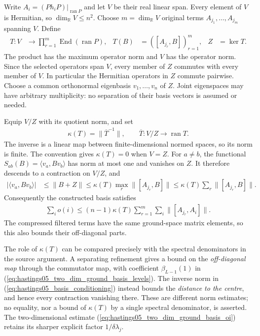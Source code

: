 \documentclass{article}
\begin{document}
Write $A_i=(Ph_iP)|_{\operatorname{ran}P}$ and let $V$ be their real linear
span. Every element of $V$ is Hermitian, so $\dim_{\mathbb R}V\le n^2$.
Choose $m=\dim_{\mathbb R}V$ original terms $A_{j_1},\dots,A_{j_m}$ spanning
$V$. Define
\begin{align}
 T:V&\longrightarrow\prod_{r=1}^m\operatorname{End}(\operatorname{ran}P),
 &T(B)&=([A_{j_r},B])_{r=1}^m,
 &Z&=\ker T.
 \label{eq:hastings05_basis_commutator_map}
\end{align}
The product has the maximum operator norm and $V$ has the operator norm.
Since the selected operators span $V$, every member of $Z$ commutes with every
member of $V$. In particular the Hermitian operators in $Z$ commute pairwise.
Choose a common orthonormal eigenbasis $v_1,\dots,v_n$ of $Z$. Joint
eigenspaces may have arbitrary multiplicity: no separation of their basis
vectors is assumed or needed.

Equip $V/Z$ with its quotient norm, and set
\begin{align}
 \kappa(T)=\|\overline T^{-1}\|,
 \qquad \overline T:V/Z\longrightarrow\operatorname{ran}T.
 \label{eq:hastings05_basis_conditioning}
\end{align}
The inverse is a linear map between finite-dimensional normed spaces, so its
norm is finite. The convention gives $\kappa(T)=0$ when $V=Z$.
For $a\ne b$, the functional $S_{ab}(B)=\langle v_a,Bv_b\rangle$ has norm at
most one and vanishes on $Z$. It therefore descends to a contraction on $V/Z$,
and
\begin{align}
 |\langle v_a,Bv_b\rangle|
 &\le \|B+Z\|\le\kappa(T)\max_r\|[A_{j_r},B]\|
 \le\kappa(T)\sum_r\|[A_{j_r},B]\|.
 \label{eq:hastings05_basis_constructed_entries}
\end{align}
Consequently the constructed basis satisfies
\begin{align}
 \sum_i o(i)\le(n-1)\kappa(T)\sum_{r=1}^m\sum_i\|[A_{j_r},A_i]\|.
 \label{eq:hastings05_basis_constructed_sum}
\end{align}
The compressed filtered terms have the same ground-space matrix elements, so
this also bounds their off-diagonal parts.

The role of $\kappa(T)$ can be compared precisely with the spectral denominators
in the source argument. A separating refinement gives a bound on the
\emph{off-diagonal map} through the commutator map, with coefficient
$\beta_{L-1}(1)$ in (\ref{eq:hastings05_two_dim_ground_basis_levels}).
The inverse norm in (\ref{eq:hastings05_basis_conditioning}) instead bounds the
\emph{distance to the centre}, and hence every contraction vanishing there.
These are different norm estimates; no equality, nor a bound of $\kappa(T)$ by a
single spectral denominator, is asserted. The two-dimensional estimate
(\ref{eq:hastings05_two_dim_ground_basis_oi}) retains its sharper explicit
factor $1/\delta\lambda_j$.
\end{document}
